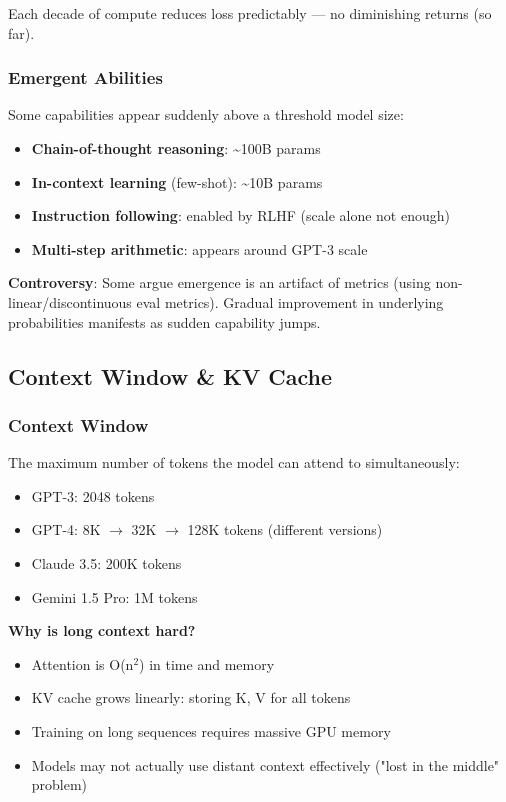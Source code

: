 \documentclass[11pt]{article}
\providecommand{\tightlist}{\setlength{\itemsep}{1pt}\setlength{\parskip}{0pt}}
\begin{document}
Each decade of compute reduces loss predictably --- no diminishing returns (so far).

\subsubsection{Emergent Abilities}\label{emergent-abilities}

Some capabilities appear suddenly above a threshold model size:

\begin{itemize}
\tightlist
\item
  \textbf{Chain-of-thought reasoning}: \textasciitilde100B params
\item
  \textbf{In-context learning} (few-shot): \textasciitilde10B params
\item
  \textbf{Instruction following}: enabled by RLHF (scale alone not enough)
\item
  \textbf{Multi-step arithmetic}: appears around GPT-3 scale
\end{itemize}

\textbf{Controversy}: Some argue emergence is an artifact of metrics (using non-linear/discontinuous eval metrics). Gradual improvement in underlying probabilities manifests as sudden capability jumps.

\subsection{Context Window \& KV Cache}\label{context-window--kv-cache}

\subsubsection{Context Window}\label{context-window}

The maximum number of tokens the model can attend to simultaneously:

\begin{itemize}
\tightlist
\item
  GPT-3: 2048 tokens
\item
  GPT-4: 8K \(\rightarrow\) 32K \(\rightarrow\) 128K tokens (different versions)
\item
  Claude 3.5: 200K tokens
\item
  Gemini 1.5 Pro: 1M tokens
\end{itemize}

\textbf{Why is long context hard?}

\begin{itemize}
\tightlist
\item
  Attention is O(n\(^2\)) in time and memory
\item
  KV cache grows linearly: storing K, V for all tokens
\item
  Training on long sequences requires massive GPU memory
\item
  Models may not actually use distant context effectively ("lost in the middle" problem)
\end{itemize}
\end{document}
